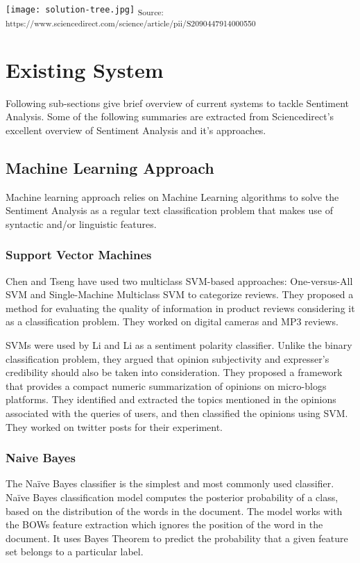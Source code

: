 \texttt{[image: solution-tree.jpg]}\newline
\textsubscript{Source: https://www.sciencedirect.com/science/article/pii/S2090447914000550}

\section{Existing System}
Following sub-sections give brief overview of current systems to tackle Sentiment Analysis. Some of the following summaries are extracted from Sciencedirect's excellent overview of Sentiment Analysis and it's approaches.


\subsection{Machine Learning Approach}
Machine learning approach relies on Machine Learning algorithms to solve the Sentiment Analysis as a regular text classification problem that makes use of syntactic and/or linguistic features.

\subsubsection{Support Vector Machines}
Chen and Tseng \cite{chen2011quality} have used two multiclass SVM-based approaches: One-versus-All SVM and Single-Machine Multiclass SVM to categorize reviews. They proposed a method for evaluating the quality of information in product reviews considering it as a classification problem. They worked on digital cameras and MP3 reviews.

SVMs were used by Li and Li \cite{li2013deriving} as a sentiment polarity classifier. Unlike the binary classification problem, they argued that opinion subjectivity and expresser's credibility should also be taken into consideration. They proposed a framework that provides a compact numeric summarization of opinions on micro-blogs platforms. They identified and extracted the topics mentioned in the opinions associated with the queries of users, and then classified the opinions using SVM. They worked on twitter posts for their experiment.

\subsubsection{Naive Bayes}
The Naïve Bayes classifier is the simplest and most commonly used classifier. Naïve Bayes classification model computes the posterior probability of a class, based on the distribution of the words in the document. The model works with the BOWs feature extraction which ignores the position of the word in the document. It uses Bayes Theorem to predict the probability that a given feature set belongs to a particular label.

